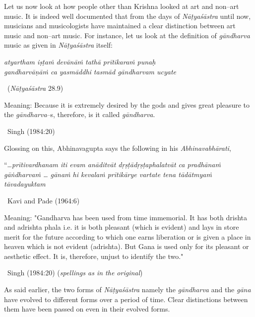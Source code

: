 Let us now look at how people other than Krishna looked at art and non–art music. It is indeed well documented that from the days of \textit{Nāṭyaśāstra} until now, musicians and musicologists have maintained a clear distinction between art music and non–art music. For instance, let us look at the definition of \textit{gāndharva} music as given in \textit{Nāṭyaśāstra} itself:

\begin{myquote}
\textit{atyartham iṣṭaṁ devānāṁ tathā prītikaraṁ punaḥ }\\\textit{gandharvāṇāṁ ca yasmāddhi tasmād gāndharvam ucyate } 

~\hfill (\textit{Nāṭyaśāstra} 28.9)
\end{myquote}

\begin{myquote}
Meaning: Because it is extremely desired by the gods and gives great pleasure to the \textit{gāndharva}–s, therefore, is it called \textit{gāndharva}. 

~\hfill Singh (1984:20)
\end{myquote}

Glossing on this, Abhinavagupta says the following in his \textit{Abhinavabhārati},

\begin{myquote}
“…\textit{prītivardhanam iti evam anāditvāt dṛṣṭādṛṣṭaphalatvāt ca pradhānaṁ gāṅdharvaṁ … gānaṁ hi kevalaṁ prītikārye vartate  tena tādātmyaṁ tāvadayuktam } 

~\hfill Kavi and Pade (1964:6)
\end{myquote}

\begin{myquote}
Meaning: "Gandharva has been used from time immemorial. It has both drishta and adrishta phala i.e. it is both pleasant (which is evident) and lays in store merit for the future according to which one earns liberation or is given a place in heaven which is not evident (adrishta). But Gana is used only for its pleasant or aesthetic effect. It is, therefore, unjust to identify the two." 

~\hfill Singh (1984:20) (\textit{spellings as in the original})
\end{myquote}

As said earlier, the two forms of \textit{Nāṭyaśāstra} namely the \textit{gāndharva} and the \textit{gāna} have evolved to different forms over a period of time. Clear distinctions between them have been passed on even in their evolved forms.

